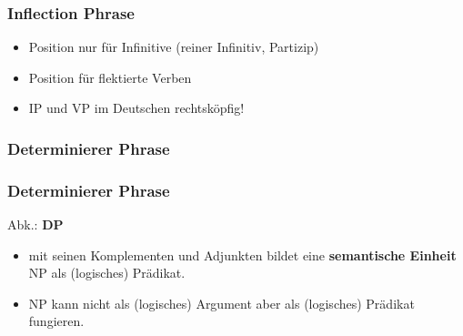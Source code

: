 \begin{frame}
\frametitle{Inflection Phrase}

	\begin{itemize}
		\item {} \ras Position nur für Infinitive (reiner Infinitiv, Partizip)
		\item {} \ras Position für flektierte Verben
		\item IP und VP im Deutschen \ras rechtsköpfig!		
	\end{itemize}


\begin{minipage}[b]{0.48\textwidth}
	\centering
\end{minipage}  
%
%          
\begin{minipage}[b]{0.48\textwidth}
	\centering
 \end{minipage}  

\end{frame}


\subsubsection{Determinierer Phrase}

\begin{frame}
\frametitle{Determinierer Phrase}

Abk.: \textbf{DP} 

\begin{itemize}
\settowidth{}
	\item {} mit seinen Komplementen und Adjunkten bildet eine \textbf{semantische Einheit} \ras NP als (logisches) Prädikat.
	\item NP kann nicht als (logisches) Argument aber als (logisches) Prädikat fungieren.
	\eal 
	\zl

\end{itemize}	

\nocite{MyP16b} \nocite{MyP16c}

\end{frame}

